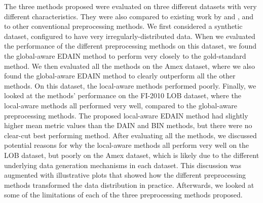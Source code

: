\documentclass{statsmsc}
\begin{document}
{%
The three methods proposed were evaluated on three different
datasets with very different characteristics. They were also compared to existing work by
\cite{dain} and \cite{bin}, and to other conventional preprocessing methods.
We first considered a synthetic dataset,
 configured to have very irregularly-distributed data. 
When we evaluated the performance of the different preprocessing methods on this dataset, we found
the global-aware \ac{EDAIN} method to perform very closely to the gold-standard method.
We then evaluated all the methods on the Amex dataset, where we also found the
global-aware \ac{EDAIN} method to clearly outperform all the other methods. On
this dataset, the local-aware methods performed poorly. Finally, we looked at
the methods' performance on the FI-2010 \ac{LOB} dataset, where the local-aware
methods all performed very well, compared to the global-aware preprocessing
methods. The proposed local-aware \ac{EDAIN} method had slightly higher mean metric values
than the \ac{DAIN} and \ac{BIN} methods, but there were no clear-cut best performing method.
After evaluating all the methods, we discussed potential reasons for why the local-aware methods
all perform very well on the \ac{LOB} dataset, but poorly on the Amex dataset,
which is likely due to the different underlying data generation mechanisms in each dataset.
This discussion was augmented with illustrative plots that showed how the different
preprocessing methods transformed the data distribution in practice.
Afterwards, we looked at some of the limitations of each of the three preprocessing
methods proposed.

}
\end{document}
